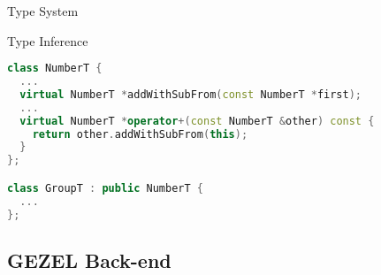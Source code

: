 \documentclass{beamer}
\begin{document}
\begin{frame}[fragile]{Type System}
  \begin{center}
  \end{center}
\end{frame}

\begin{frame}[fragile]{Type Inference}
  \begin{lstlisting}[language=C++]
class NumberT {
  ...
  virtual NumberT *addWithSubFrom(const NumberT *first);
  ...
  virtual NumberT *operator+(const NumberT &other) const {
    return other.addWithSubFrom(this);
  }
};

class GroupT : public NumberT {
  ...
};
\end{lstlisting}
\end{frame}

\subsection{GEZEL Back-end}
\end{document}
